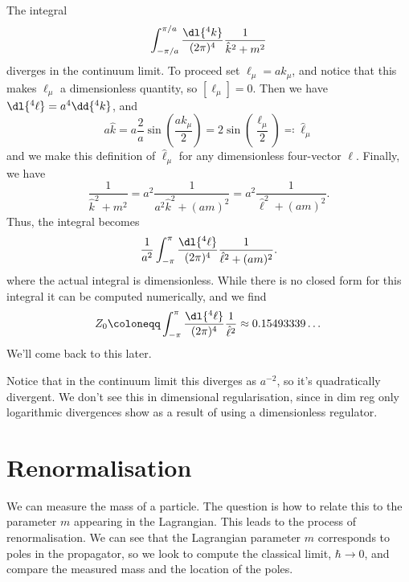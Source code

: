 \documentclass[fleqn]{NotesClass}
\begin{document}
    The integral
    \begin{equation}
        \int_{-\pi/a}^{\pi/a} \frac{\dl{^4k}}{(2\pi)^4} \frac{1}{\hat{k}^2 + m^2}
    \end{equation}
    diverges in the continuum limit.
    To proceed set \(\ell_\mu = ak_\mu\), and notice that this makes \(\ell_\mu\) a dimensionless quantity, so \([\ell_\mu] = 0\).
    Then we have \(\dl{^4\ell} = a^4\dd{^4k}\), and
    \begin{equation}
        a\hat{k} = a\frac{2}{a}\sin\left( \frac{ak_\mu}{2} \right) = 2\sin\left( \frac{\ell_\mu}{2} \right) \eqqcolon \hat{\ell}_\mu
    \end{equation}
    and we make this definition of \(\hat{\ell}_\mu\) for any dimensionless four-vector \(\ell\).
    Finally, we have
    \begin{equation}
        \frac{1}{\hat{k}^2 + m^2} = a^2\frac{1}{a^2\hat{k}^2 + (am)^2} = a^2\frac{1}{\hat{\ell}^2 + (am)^2}.
    \end{equation}
    Thus, the integral becomes
    \begin{equation}
        \frac{1}{a^2} \int_{-\pi}^{\pi} \frac{\dl{^4\ell}}{(2\pi)^4} \frac{1}{\hat{\ell}^2 + (am)^2}.
    \end{equation}
    where the actual integral is dimensionless.
    While there is no closed form for this integral it can be computed numerically, and we find
    \begin{equation}
        Z_0 \coloneqq \int_{-\pi}^{\pi} \frac{\dl{^4\ell}}{(2\pi)^4} \frac{1}{\hat{\ell}^2} \approx 0.15493339\dotso
    \end{equation}
    We'll come back to this later.
    
    Notice that in the continuum limit this diverges as \(a^{-2}\), so it's quadratically divergent.
    We don't see this in dimensional regularisation, since in dim reg only logarithmic divergences show as a result of using a dimensionless regulator.
    
    \section{Renormalisation}\label{sec:renormalisation}
    We can measure the mass of a particle.
    The question is how to relate this to the parameter \(m\) appearing in the Lagrangian.
    This leads to the process of renormalisation.
    We can see that the Lagrangian parameter \(m\) corresponds to poles in the propagator, so we look to compute the classical limit, \(\hbar \to 0\), and compare the measured mass and the location of the poles.
    
\end{document}

